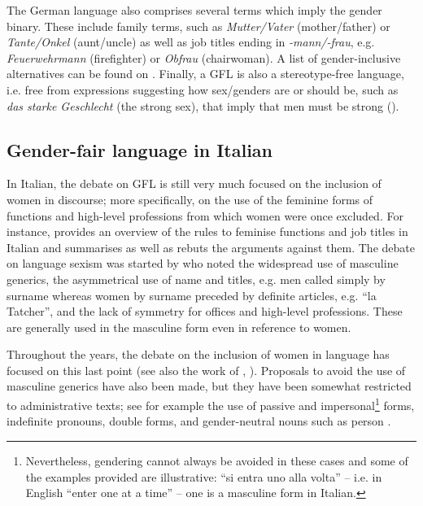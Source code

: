 The German language also comprises several terms which imply the gender binary. These include family terms, such as \textit{Mutter/Vater} (mother/father) or \textit{Tante/Onkel} (aunt/uncle) as well as job titles ending in \textit{-mann/-frau}, e.g. \textit{Feuerwehrmann} (firefighter) or \textit{Obfrau} (chairwoman). A list of gender-inclusive alternatives can be found on \textcite{nibispace}. Finally, a GFL is also a stereotype-free language, i.e. free from expressions suggesting how sex/genders are or should be, such as \textit{das starke Geschlecht} (the strong sex), that imply that men must be strong (\cite[33]{boka2021richtlinie}).

 
\subsection{Gender-fair language in Italian}
In Italian, the debate on GFL is still very much focused on the inclusion of women in discourse; more specifically, on the use of the feminine forms of functions and high-level professions from which women were once excluded. For instance, \textcite{gheno2019femminili} provides an overview of the rules to feminise functions and job titles in Italian and summarises as well as rebuts the arguments against them. The debate on language sexism was started by \textcite{sabatini1986raccomandazioni} who noted the widespread use of masculine generics, the asymmetrical use of name and titles, e.g. men called simply by surname whereas women by surname preceded by definite articles, e.g. ``la Tatcher'', and the lack of symmetry for offices and high-level professions. These are generally used in the masculine form even in reference to women.

Throughout the years, the debate on the inclusion of women in language has focused on this last point (see also the work of \cite{robustelli2012linee}, \cite*{robustelli2014donne}). Proposals to avoid the use of masculine generics have also been made, but they have been somewhat restricted to administrative texts; see for example the use of passive and impersonal\footnote{Nevertheless, gendering cannot always be avoided in these cases and some of the examples provided are illustrative: ``si entra uno alla volta'' -- i.e. in English ``enter one at a time'' -- one is a masculine form in Italian.} forms, indefinite pronouns, double forms, and gender-neutral nouns such as person \citep[22]{robustelli2012linee}.

